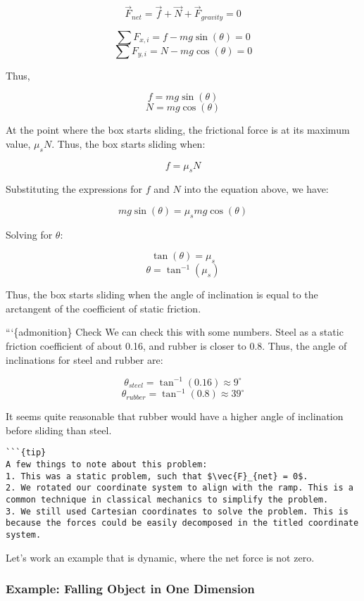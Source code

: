 \[\vec{F}_{net} = \vec{f} + \vec{N} + \vec{F}_{gravity} = 0\]

\[\sum F_{x,i} = f - mg\sin(\theta) = 0\]
\[\sum F_{y,i} = N - mg\cos(\theta) = 0\]

Thus,

\[f = mg\sin(\theta)\] \[N = mg\cos(\theta)\]

At the point where the box starts sliding, the frictional force is at
its maximum value, \(\mu_s N\). Thus, the box starts sliding when:

\[f = \mu_s N\]

Substituting the expressions for \(f\) and \(N\) into the equation
above, we have:

\[mg\sin(\theta) = \mu_s mg\cos(\theta)\]

Solving for \(\theta\):

\[\tan(\theta) = \mu_s\] \[\theta = \tan^{-1}(\mu_s)\]

Thus, the box starts sliding when the angle of inclination is equal to
the arctangent of the coefficient of static friction.

```\{admonition\} Check We can check this with some numbers. Steel as a
static friction coefficient of about 0.16, and rubber is closer to 0.8.
Thus, the angle of inclinations for steel and rubber are:

\[\theta_{steel} = \tan^{-1}(0.16) \approx 9^\circ\]
\[\theta_{rubber} = \tan^{-1}(0.8) \approx 39^\circ\]

It seems quite reasonable that rubber would have a higher angle of
inclination before sliding than steel.

\begin{verbatim}
```{tip}
A few things to note about this problem:
1. This was a static problem, such that $\vec{F}_{net} = 0$.
2. We rotated our coordinate system to align with the ramp. This is a common technique in classical mechanics to simplify the problem.
3. We still used Cartesian coordinates to solve the problem. This is because the forces could be easily decomposed in the titled coordinate system.
\end{verbatim}

Let's work an example that is dynamic, where the net force is not zero.

\subsubsection{Example: Falling Object in One
Dimension}\label{example-falling-object-in-one-dimension}

